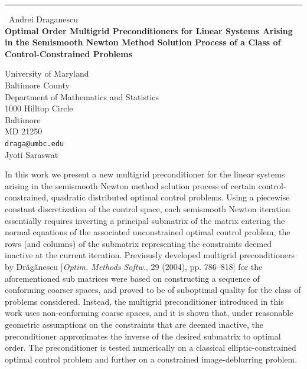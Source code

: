 \documentclass{report}
\begin{document}
\begin{center}
\rule{6in}{1pt} \
{\large Andrei Draganescu \\
{\bf Optimal Order Multigrid Preconditioners for Linear Systems Arising in the Semismooth Newton Method Solution Process of a Class of Control-Constrained Problems}}

University of Maryland \\ Baltimore County \\ Department of Mathematics and Statistics \\ 1000 Hilltop Circle \\ Baltimore \\ MD 21250
\\
{\tt draga@umbc.edu}\\
Jyoti Saraswat\end{center}

In this work we present a new multigrid preconditioner for the linear
systems arising in the semismooth Newton method solution process of
certain control-constrained, quadratic distributed optimal control
problems. Using a piecewise constant discretization of the control space,
each semismooth Newton iteration essentially
requires inverting a principal submatrix of the matrix entering the
normal equations of the associated unconstrained optimal control problem,
the rows (and columns) of the submatrix representing the constraints
deemed inactive at the current iteration. Previously developed multigrid
preconditioners by Dr{\u a}g{\u a}nescu
[\emph{Optim. Methods Softw.}, 29 (2004), pp. 786--818] for the
aforementioned sub matrices were based on constructing a sequence of
conforming coarser spaces, and proved to be of suboptimal quality for the
class of problems considered. Instead, the multigrid preconditioner
introduced in this work uses non-conforming coarse spaces, and it is
shown that, under reasonable geometric assumptions on the constraints
that are deemed inactive, the preconditioner approximates the inverse of
the desired submatrix to optimal order. The preconditioner is tested
numerically on a classical elliptic-constrained optimal control problem
and further on a constrained image-deblurring problem.
\end{document}
